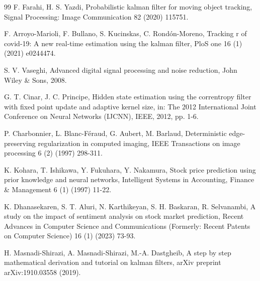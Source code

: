 \documentclass[12pt,a4paper]{article}
\begin{document}
\begin{thebibliography}{99}
		 F. Farahi, H. S. Yazdi, Probabilistic kalman filter for moving object tracking, Signal Processing: Image Communication 82 (2020) 115751.
		
		 F. Arroyo-Marioli, F. Bullano, S. Kucinskas, C. Rondón-Moreno, Tracking r of covid-19: A new real-time estimation using the kalman filter, PloS one 16 (1) (2021) e0244474.
		
		 S. V. Vaseghi, Advanced digital signal processing and noise reduction, John Wiley \& Sons, 2008.
		
		 G. T. Cinar, J. C. Principe, Hidden state estimation using the correntropy filter with fixed point update and adaptive kernel size, in: The 2012 International Joint Conference on Neural Networks (IJCNN), IEEE, 2012, pp. 1-6.
		
		 P. Charbonnier, L. Blanc-Féraud, G. Aubert, M. Barlaud, Deterministic edge-preserving regularization in computed imaging, IEEE Transactions on image processing 6 (2) (1997) 298-311.
		
		 K. Kohara, T. Ishikawa, Y. Fukuhara, Y. Nakamura, Stock price prediction using prior knowledge and neural networks, Intelligent Systems in Accounting, Finance \& Management 6 (1) (1997) 11-22.
		
		 K. Dhanasekaren, S. T. Aluri, N. Karthikeyan, S. H. Baskaran, R. Selvanambi, A study on the impact of sentiment analysis on stock market prediction, Recent Advances in Computer Science and Communications (Formerly: Recent Patents on Computer Science) 16 (1) (2023) 73-93.
		
		 H. Masnadi-Shirazi, A. Masnadi-Shirazi, M.-A. Dastgheib, A step by step mathematical derivation and tutorial on kalman filters, arXiv preprint arXiv:1910.03558 (2019).
		
	\end{thebibliography}
	
\end{document}
